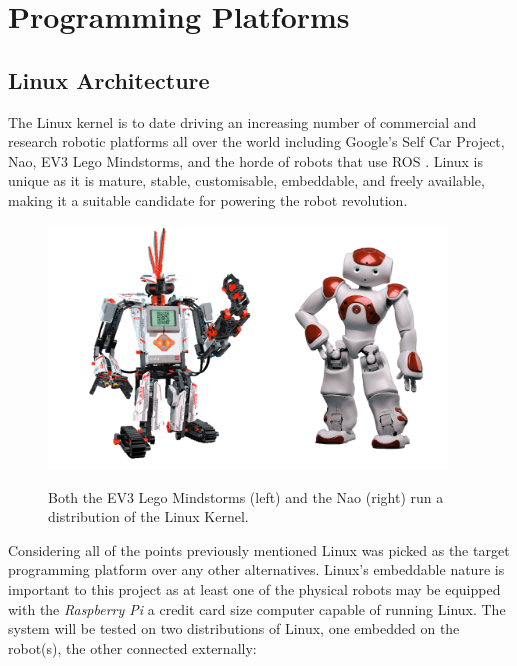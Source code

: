 
\section{Programming Platforms}

\subsection{Linux Architecture}
\noindent
The Linux kernel is to date driving an increasing number of commercial and research robotic platforms all over the world including Google's Self Car Project, Nao, EV3 Lego Mindstorms, and the horde of robots that use ROS \cite{MIT, NAO, EV3, ROS}. Linux is unique as it is mature, stable, customisable, embeddable, and freely available, making it a suitable candidate for powering the robot revolution. \\

\begin{figure}[htbp]

\center \includegraphics[width=300pt]{illustrations/ev3_nao.png}\\
\caption{Both the EV3 Lego Mindstorms (left) and the Nao (right) run a distribution of the Linux Kernel. \cite{EV3, NAO}} 
\label{central thread}

\end{figure}

\noindent
Considering all of the points previously mentioned Linux was picked as the target programming platform over any other alternatives. Linux's embeddable nature is important to this project as at least one of the physical robots may be equipped with the \textit{Raspberry Pi} a credit card size computer capable of running Linux. The system will be tested on two distributions of Linux, one embedded on the robot(s), the other connected externally:

